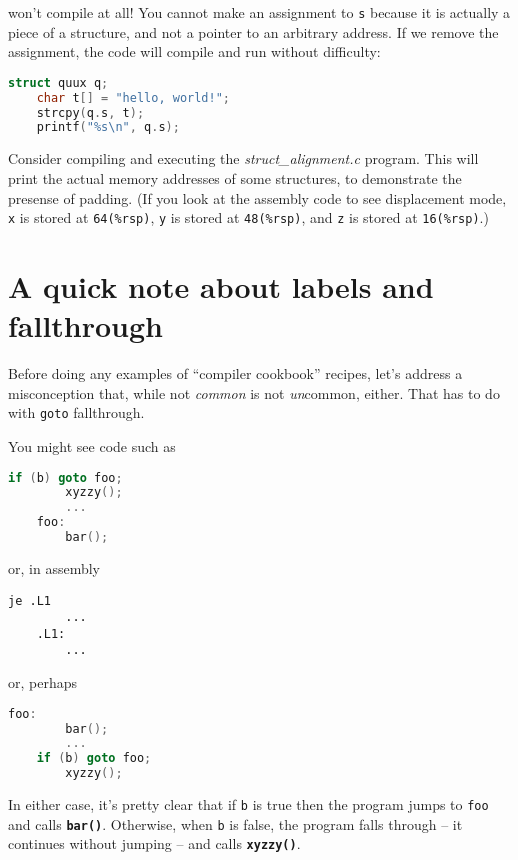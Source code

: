 \documentclass{article}
\newcommand{\function}[1]{\textbf{\lstinline{#1}}}
\begin{document}
won't compile at all!
You cannot make an assignment to \lstinline{s} because it is actually a piece of a structure, and not a pointer to an arbitrary address.
If we remove the assignment, the code will compile and run without difficulty:

\begin{lstlisting}[language=C]
    struct quux q;
    char t[] = "hello, world!";
    strcpy(q.s, t);
    printf("%s\n", q.s);
\end{lstlisting}

Consider compiling and executing the \textit{struct\_alignment.c} program.
This will print the actual memory addresses of some structures, to demonstrate the presense of padding.
(If you look at the assembly code to see displacement mode, \lstinline{x} is stored at \lstinline{64(%rsp)}, \lstinline{y} is stored at \lstinline{48(%rsp)}, and \lstinline{z} is stored at \lstinline{16(%rsp)}.)

\section*{A quick note about labels and fallthrough}

Before doing any examples of ``compiler cookbook'' recipes, let's address a misconception that, while not \textit{common} is not \textit{un}common, either.
That has to do with \lstinline{goto} fallthrough.

You might see code such as

\begin{lstlisting}[language=C]
        if (b) goto foo;
        xyzzy();
        ...
    foo:
        bar();
\end{lstlisting}

or, in assembly

\begin{lstlisting}[language={[x86masm]Assembler}]
        je .L1
        ...
    .L1:
        ...
\end{lstlisting}

or, perhaps

\begin{lstlisting}[language=C]
    foo:
        bar();
        ...
    if (b) goto foo;
        xyzzy();
\end{lstlisting}

In either case, it's pretty clear that if \lstinline{b} is true then the program jumps to \lstinline{foo} and calls \function{bar()}.
Otherwise, when \lstinline{b} is false, the program falls through -- it continues without jumping -- and calls \function{xyzzy()}.
\end{document}
